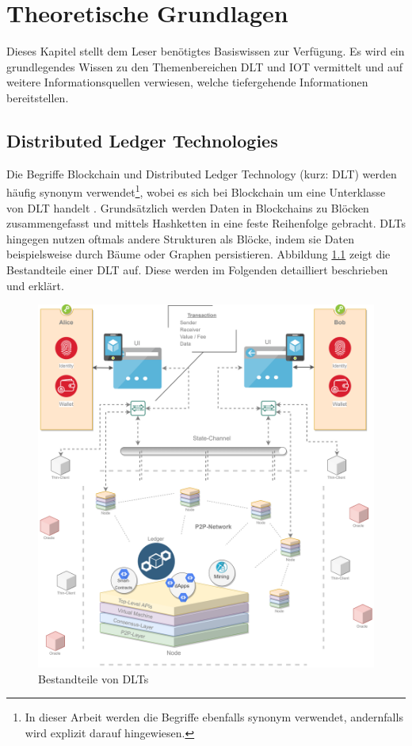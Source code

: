 \chapter{Theoretische Grundlagen}
\label{ch:fundamentals}
Dieses Kapitel stellt dem Leser benötigtes Basiswissen zur Verfügung. Es wird ein grundlegendes Wissen zu den Themenbereichen \ac{DLT} und \ac{IOT} vermittelt und auf weitere Informationsquellen verwiesen, welche tiefergehende Informationen bereitstellen.

%
%
\section{Distributed Ledger Technologies}
\label{sec:fundamentals:dlt}
Die Begriffe Blockchain und Distributed Ledger Technology (kurz: \ac{DLT}) werden häufig synonym verwendet\footnote{In dieser Arbeit werden die Begriffe ebenfalls synonym verwendet, andernfalls wird explizit darauf hingewiesen.}, wobei es sich bei Blockchain um eine Unterklasse von \ac{DLT} handelt \cite{mastering2017}. Grundsätzlich werden Daten in Blockchains zu Blöcken zusammengefasst und mittels Hashketten in eine feste Reihenfolge gebracht. \ac{DLT}s hingegen nutzen oftmals andere Strukturen als Blöcke, indem sie Daten beispielsweise durch Bäume oder Graphen persistieren. Abbildung \ref{fig:chapter02:overview-dlt} zeigt die Bestandteile einer \ac{DLT} auf. Diese werden im Folgenden detailliert beschrieben und erklärt.\\

\begin{figure}[h]
 \centering
 \includegraphics[width=1.0\textwidth]{gfx/Overview-DLT.png}
 \caption{Bestandteile von DLTs}
 \label{fig:chapter02:overview-dlt}
\end{figure}

